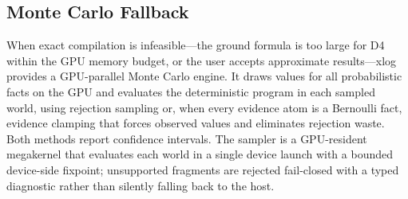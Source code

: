 \subsection{Monte Carlo Fallback}

When exact compilation is infeasible---the ground formula is too large for D4 within the GPU memory budget, or the user accepts approximate results---xlog provides a GPU-parallel Monte Carlo engine. It draws values for all probabilistic facts on the GPU and evaluates the deterministic program in each sampled world, using rejection sampling or, when every evidence atom is a Bernoulli fact, evidence clamping that forces observed values and eliminates rejection waste. Both methods report confidence intervals. The sampler is a GPU-resident megakernel that evaluates each world in a single device launch with a bounded device-side fixpoint; unsupported fragments are rejected fail-closed with a typed diagnostic rather than silently falling back to the host.
